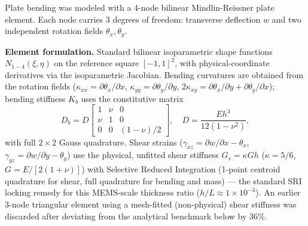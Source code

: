 \documentclass[11pt]{article}
\begin{document}
Plate bending was modeled with a 4-node bilinear Mindlin-Reissner plate element. Each node carries 3 degrees of freedom: transverse deflection $w$ and two independent rotation fields $\theta_x, \theta_y$.

\textbf{Element formulation.} Standard bilinear isoparametric shape functions $N_{1-4}(\xi,\eta)$ on the reference square $[-1,1]^2$, with physical-coordinate derivatives via the isoparametric Jacobian. Bending curvatures are obtained from the rotation fields ($\kappa_{xx} = \partial\theta_x/\partial x$, $\kappa_{yy} = \partial\theta_y/\partial y$, $2\kappa_{xy} = \partial\theta_x/\partial y + \partial\theta_y/\partial x$); bending stiffness $K_b$ uses the constitutive matrix
\[
D_b = D \begin{bmatrix} 1 & \nu & 0 \\ \nu & 1 & 0 \\ 0 & 0 & (1-\nu)/2 \end{bmatrix}, \quad D = \frac{Eh^3}{12(1-\nu^2)},
\]
with full $2\times2$ Gauss quadrature. Shear strains ($\gamma_{xz} = \partial w/\partial x - \theta_x$, $\gamma_{yz} = \partial w/\partial y - \theta_y$) use the physical, unfitted shear stiffness $G_s = \kappa G h$ ($\kappa=5/6$, $G=E/[2(1+\nu)]$) with Selective Reduced Integration (1-point centroid quadrature for shear, full quadrature for bending and mass) --- the standard SRI locking remedy \cite{hughes1978,hughes1981} for this MEMS-scale thickness ratio ($h/L \approx 1\times10^{-3}$). An earlier 3-node triangular element using a mesh-fitted (non-physical) shear stiffness was discarded after deviating from the analytical benchmark below by 36\%.
\end{document}
